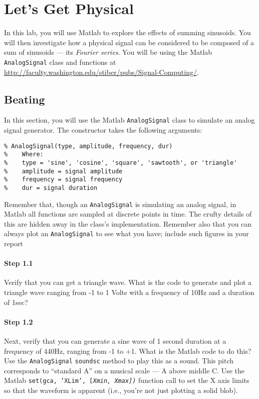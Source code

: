 
\section{Let's Get Physical}

In this lab, you will use Matlab to explore the effects of summing
sinusoids. You will then investigate how a physical signal can be
considered to be composed of a sum of sinusoids --- its \emph{Fourier
  series}. You will be using the Matlab \texttt{AnalogSignal} class
and functions at
\url{http://faculty.washington.edu/stiber/pubs/Signal-Computing/}.

\subsection{Beating}

In this section, you will use the Matlab \texttt{AnalogSignal} class
to simulate an analog signal generator. The constructor takes the
following arguments:
\begin{verbatim}
% AnalogSignal(type, amplitude, frequency, dur)
%    Where:
%    type = 'sine', 'cosine', 'square', 'sawtooth', or 'triangle'
%    amplitude = signal amplitude
%    frequency = signal frequency
%    dur = signal duration
\end{verbatim}

Remember that, though an \texttt{AnalogSignal} is simulating an analog
signal, in Matlab all functions are sampled at discrete points in
time. The crufty details of this are hidden away in the class's
implementation. Remember also that you can always plot an
\texttt{AnalogSignal} to see what you have; include such figures in
your report 

\paragraph{Step 1.1} Verify that you can get a triangle wave. What is
the code to generate and plot a triangle wave ranging from -1 to 1
Volts with a frequency of 10Hz and a duration of 1sec?

\paragraph{Step 1.2} Next, verify that you can generate a sine wave of
1 second duration at a frequency of 440Hz, ranging from -1 to +1. What
is the Matlab code to do this? Use the \texttt{AnalogSignal}
\texttt{soundsc} method to play this as a sound. This pitch
corresponds to ``standard A'' on a musical scale --- A above middle
C. Use the Matlab \texttt{set(gca, 'XLim', [\itshape{Xmin},
  \itshape{Xmax}])} function call to set the X axis limits so that the
waveform is apparent (i.e., you're not just plotting a solid blob).

